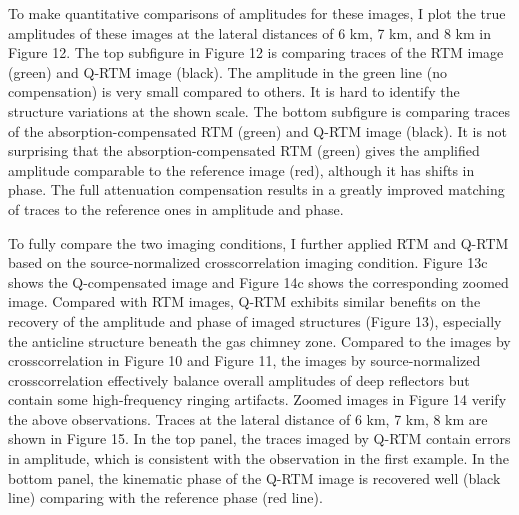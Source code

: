 To make quantitative comparisons of amplitudes for these images, I plot the true amplitudes of these images at the lateral distances of 6 km, 7 km, and 8 km in Figure 12. The top subfigure in Figure 12 is comparing traces of the RTM image (green) and Q-RTM image (black). The amplitude in the green line (no compensation) is very small compared to others. It is hard to identify the structure variations at the shown scale. The bottom subfigure is comparing traces of the absorption-compensated RTM (green) and Q-RTM image (black). It is not surprising that the absorption-compensated RTM (green) gives the amplified amplitude comparable to the reference image (red), although it has shifts in phase. The full attenuation compensation results in a greatly improved matching of traces to the reference ones in amplitude and phase.


To fully compare the two imaging conditions, I further applied RTM and Q-RTM based on the source-normalized crosscorrelation imaging condition. Figure 13c shows the Q-compensated image and Figure 14c shows the corresponding zoomed image. Compared with RTM images, Q-RTM exhibits similar benefits on the recovery of the amplitude and phase of imaged structures (Figure 13), especially the anticline structure beneath the gas chimney zone. Compared to the images by crosscorrelation in Figure 10 and Figure 11, the images by source-normalized crosscorrelation effectively balance overall amplitudes of deep reflectors but contain some high-frequency ringing artifacts. Zoomed images in Figure 14 verify the above observations. Traces at the lateral distance of 6 km, 7 km, 8 km are shown in Figure 15. In the top panel, the traces imaged by Q-RTM contain errors in amplitude, which is consistent with the observation in the first example. In the bottom panel, the kinematic phase of the Q-RTM image is recovered well (black line) comparing with the reference phase (red line).




